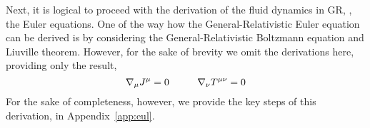 Next, it is logical to proceed with the derivation of the fluid dynamics in \ac{GR}, \ie, the 
Euler equations.
One of the way how the General-Relativistic Euler equation can be derived is by considering the 
General-Relativistic Boltzmann equation and Liuville theorem. 
However, for the sake of brevity we omit the derivations here, providing only the result,
%
\begin{equation}
\nabla_{\mu}J^{\mu} =0 \hspace{10mm}\nabla_{\nu}T^{\mu\nu} =0
\end{equation}
%
For the sake of completeness, however, we provide the key steps of this derivation, in Appendix~\ref{app:eul}.




